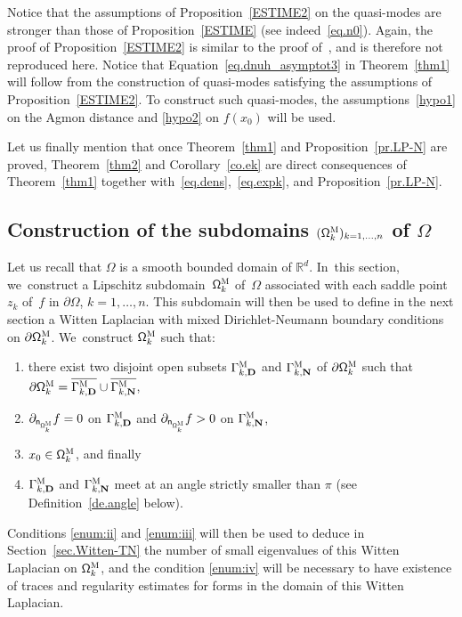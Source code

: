 \documentclass[10pt]{amsart}
\newenvironment{enumeratei}
{\bgroup\def\theenumi{\roman{enumi}}\def\theenumii{\arabic{enumii}}\begin{enumerate}}
{\end{enumerate}\egroup}
\newcommand{\mbf}[1]{\mathbf{#1}}
\let\pa\partial
\theoremstyle{plain}
\theoremstyle{definition}
\begin{document}
Notice that the assumptions of Proposition~\ref{ESTIME2} on the
quasi-modes are stronger than those of Proposition~\ref{ESTIME} (see indeed~\eqref{eq.n0}).
Again, the proof of Proposition~\ref{ESTIME2} is similar to the proof
of~\cite[Prop.\,25]{DLLN}, and is therefore not reproduced
here. Notice that Equation~\eqref{eq.dnuh_asymptot3} in
Theorem~\ref{thm1} will follow from the construction of quasi-modes
satisfying the assumptions of Proposition~\ref{ESTIME2}. To construct such quasi-modes, the assumptions~\eqref{hypo1} on the Agmon distance and \eqref{hypo2} on $f(x_0)$ will be used.

Let us finally mention that once Theorem~\ref{thm1} and Proposition~\ref{pr.LP-N} are proved, Theorem~\ref{thm2} and Corollary~\ref{co.ek} are direct consequences of Theorem~\ref{thm1} together with~\eqref{eq.dens},~\eqref{eq.expk}, and Proposition~\ref{pr.LP-N}.

\subsection{Construction of the subdomains $(\mathsf
\Omega_k^{\textsc{M}})_{k=1,\ldots,n}$ of $\Omega$}\label{sec:omegakM}
Let us recall that $\Omega$ is a smooth bounded domain of $\mathbb R^d$. In~this section, we~construct a Lipschitz subdomain~$\mathsf \Omega_k^{\textsc{M}}$ of~$\Omega$ associated with each saddle point $z_k$ of~$f$ in $\partial \Omega$, $k=1,\ldots,n$. This subdomain will then be used to define in the next section a Witten Laplacian
with mixed Dirichlet-Neumann boundary
conditions on $\pa \mathsf \Omega_k^{\textsc{M}}$. We~construct
$\mathsf \Omega_k^{\textsc{M}}$ such that:
\begin{enumeratei}
\item\label{enum:i}
there exist
two disjoint open subsets $\Gamma_{k,\mbf D}^{\textsc{M}}$ and $\Gamma_{k,\mbf N}^{\textsc{M}}$ of $\pa \mathsf \Omega_k^{\textsc{M}}$ such that $\partial \mathsf
\Omega_k^{\textsc{M}} = \overline{\Gamma_{k,\mbf D}^{\textsc{M}}} \cup
\overline{\Gamma_{k,\mbf N}^{\textsc{M}}}$,

\item\label{enum:ii}
$\partial_{\mathsf n_{ \mathsf
\Omega_k^{\textsc{M}} } }f=0$ on $\Gamma_{k,\mbf D}^{\textsc{M}}$
and $\partial_{\mathsf n_{ \mathsf \Omega_k^{\textsc{M}} } }f>0$ on
$\Gamma_{k,\mbf N}^{\textsc{M}}$,

\item\label{enum:iii}
$x_0\in \mathsf
\Omega_k^{\textsc{M}}$, and finally 

\item\label{enum:iv}
$\Gamma_{k,\mbf D}^{\textsc{M}}$ and $\Gamma_{k,\mbf N}^{\textsc{M}}$ meet at an angle strictly smaller than $\pi$ (see Definition~\ref{de.angle} below). 
\end{enumeratei}
Conditions \eqref{enum:ii} and \eqref{enum:iii} will then be used to deduce in Section~\ref{sec.Witten-TN} the number of small eigenvalues of this Witten Laplacian on $\mathsf \Omega_k^{\textsc{M}}$, and the condition \eqref{enum:iv} will be necessary to have existence of traces and regularity estimates for forms in the domain of this Witten Laplacian.
\end{document}
